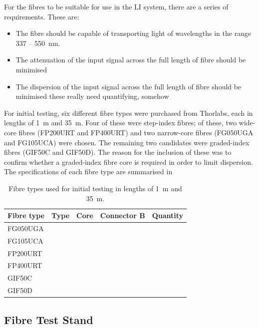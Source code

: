 \documentclass[a4paper,11pt]{article}
\begin{document}
For the fibres to be suitable for use in the LI system, there are a series of requirements. These are:
\begin{itemize}
\item The fibre should be capable of transporting light of wavelengths in the range 337 -- 550~nm.
\item The attenuation of the input signal across the full length of fibre should be minimised
\item The dispersion of the input signal across the full length of fibre should be minimised {\color{red} these really need quantifying, somehow}
\end{itemize}

For initial testing, six different fibre types were purchased from Thorlabs, each in lengths of 1~m and 35~m. Four of these were step-index fibres; of these, two wide-core fibres (FP200URT and FP400URT) and two narrow-core fibres (FG050UGA and FG105UCA) were chosen. The remaining two candidates were graded-index fibres (GIF50C and GIF50D). The reason for the inclusion of these was to confirm whether a graded-index fibre core is required in order to limit dispersion. The specifications of each fibre type are summarised in 

\begin{table}[h]
\centering
\begin{tabular}{lllll}
\hline
Fibre type & Type   & Core \diameter [$\mu$m] 	& Connector B & Quantity \\ \hline
FG050UGA   &        &             				&             &          \\
FG105UCA   &        &             				&             &          \\
FP200URT   &        &             				&             &          \\
FP400URT   &        &             				&             &          \\
GIF50C     &        &             				&             &          \\
GIF50D     &        &            				&             &         \\ \hline
\end{tabular}
\caption{Fibre types used for initial testing in lengths of 1~m and 35~m.}\label{tab:fibres}
\end{table}

\subsection{Fibre Test Stand}
\end{document}
